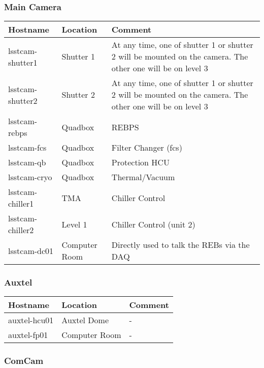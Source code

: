 \subsubsection{Main Camera}

\begin{tabular}{|p{5cm}|p{3cm}|p{5cm}| }
    \hline
    \rowcolor{lightgray}
    Hostname & Location & Comment \\
    \hline
    lsstcam-shutter1 & Shutter 1 & At any time, one of shutter 1 or shutter 2 will be mounted on the camera. The other one will be on level 3 \\
    \hline
    lsstcam-shutter2 & Shutter 2 & At any time, one of shutter 1 or shutter 2 will be mounted on the camera. The other one will be on level 3 \\
    \hline
    lsstcam-rebps & Quadbox & REBPS \\
    \hline
    lsstcam-fcs & Quadbox & Filter Changer (fcs) \\
    \hline
    lsstcam-qb & Quadbox & Protection HCU \\
    \hline
    lsstcam-cryo & Quadbox & Thermal/Vacuum \\
    \hline
    lsstcam-chiller1 & TMA & Chiller Control \\
    \hline
    lsstcam-chiller2 & Level 1 & Chiller Control (unit 2) \\
    \hline
    lsstcam-dc01 & Computer Room & Directly used to talk the REBs via the DAQ \\
    \hline
\end{tabular}

\subsubsection{Auxtel}

\begin{tabular}{|p{5cm}|p{3cm}|p{5cm}| }
    \hline
    \rowcolor{lightgray}
    Hostname & Location & Comment \\
    \hline
    auxtel-hcu01 & Auxtel Dome & - \\
    \hline
    auxtel-fp01 & Computer Room & - \\
    \hline
\end{tabular}

\subsubsection{ComCam}

